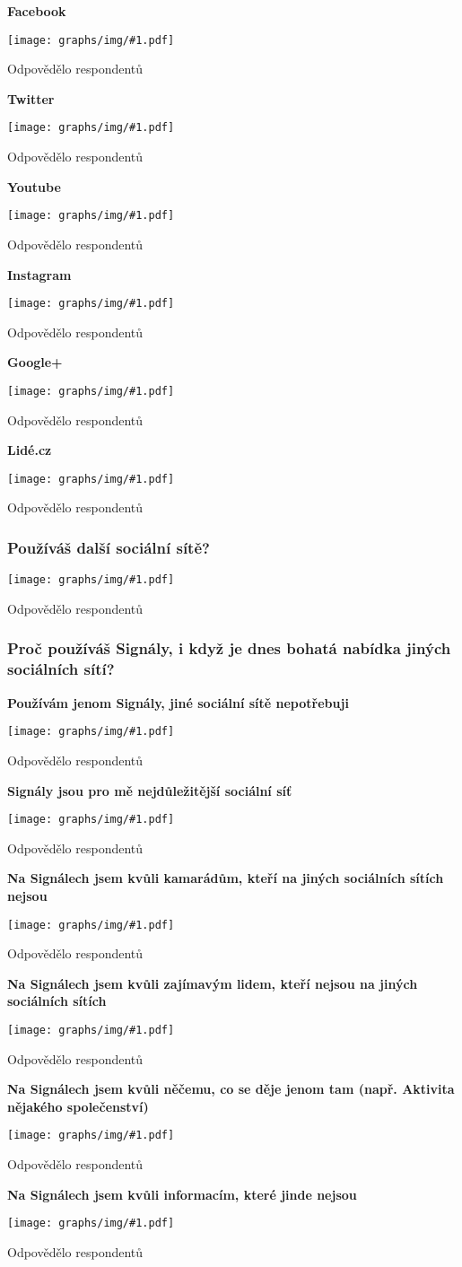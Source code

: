 \documentclass[12pt, a4paper, twoside]{article}
\newcommand{\answercount}[1]{Odpovědělo  respondentů}
\newcommand{\includegraph}[1]{
  \texttt{[image: graphs/img/\#1.pdf]}

  \answercount{#1}
}
\begin{document}
\textbf{Facebook}

\includegraph{jine_site_Facebook}

\textbf{Twitter}

\includegraph{jine_site_Twitter}

\textbf{Youtube}

\includegraph{jine_site_Youtube}

\textbf{Instagram}

\includegraph{jine_site_Instagram}

\textbf{Google+}

\includegraph{jine_site_Googleplus}

\textbf{Lidé.cz}

\includegraph{jine_site_Lidecz}

\subsubsection{Používáš další sociální sítě?}

\includegraph{pouzivas_dalsi_socialni_site}

\subsubsection{Proč používáš Signály, i když je dnes bohatá nabídka jiných sociálních sítí?}

\textbf{Používám jenom Signály, jiné sociální sítě nepotřebuji}

\includegraph{proc_signaly_jenom_signaly}

\textbf{Signály jsou pro mě nejdůležitější sociální síť}

\includegraph{proc_signaly_signaly_nejdulezitejsi}

\textbf{Na Signálech jsem kvůli kamarádům, kteří na jiných sociálních sítích nejsou}

\includegraph{proc_signaly_kamaradi_kteri_jinde_nejsou}

\textbf{Na Signálech jsem kvůli zajímavým lidem, kteří nejsou na jiných sociálních sítích}

\includegraph{proc_signaly_zajimavi_lide_kteri_jinde_nejsou}

\textbf{Na Signálech jsem kvůli něčemu, co se děje jenom tam (např. Aktivita nějakého společenství)}

\includegraph{proc_signaly_jedinecna_aktivita}

\textbf{Na Signálech jsem kvůli informacím, které jinde nejsou}

\includegraph{proc_signaly_jedinecne_informace}
\end{document}
